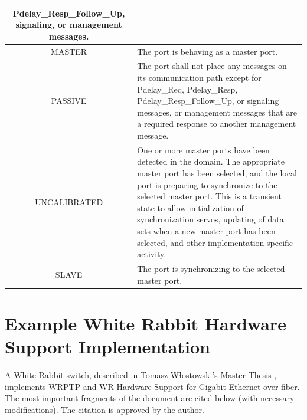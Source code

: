 \documentclass[a4paper, 12pt]{article}
\begin{document}
\begin{table}[hp!]
\begin{tabular}{| c | p{9.5cm} |}
		      Pdelay\_Resp\_Follow\_Up, signaling, or management messages.  \\ \hline
MASTER             &  \small The port is behaving as a master port.   \\ \hline
PASSIVE            &  \small The port shall not place any messages on its communication path except 
		      for Pdelay\_Req,
		      Pdelay\_Resp, Pdelay\_Resp\_Follow\_Up, or signaling messages, or management
		      messages that
		      are a required response to another management message.\\ \hline
UNCALIBRATED       &  \small One or more master ports have been detected in the domain. The 
		      appropriate master port has
		      been selected, and the local port is preparing to synchronize to the selected 
		      master port. This is a
		      transient state to allow initialization of synchronization servos, updating of
		      data sets when a new
		      master port has been selected, and other implementation-specific activity.   
		      \\ \hline
SLAVE              &  \small The port is synchronizing to the selected master port.  \\ \hline
\end{tabular}
\label{tab:ptp_port_state_def}
\end{table}


\newpage

\section{Example White Rabbit Hardware Support Implementation}
\label{sec:sampleHW}


A White Rabbit switch, described in Tomasz W\l{}ostowski's Master Thesis \cite{tomekMSC}, 
implements WRPTP and WR Hardware Support for Gigabit Ethernet over fiber. 
The most important fragments of the document are cited below (with necessary modifications).
The citation is approved by the author.

% 
\end{document}
